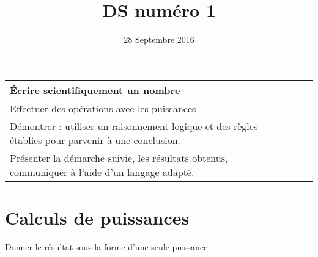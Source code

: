 \documentclass[a4paper,11pt]{exam}
\date{28 Septembre 2016}
\title{DS num\'ero 1}
\makeatletter
\def\maketitle{%
	\par\centering\Huge\textbf{\@title}%
	\par}
\makeatother
\begin{document}
	
	\maketitle

\begin{small}
\begin{center}
	\begin{tabular}{|@{\ }l@{}|@{\ }c@{\ }|}
		\hline
		\'Ecrire scientifiquement un nombre &  \ \ \ \\
		\hline
		Effectuer des opérations avec les puissances &  \\
		\hline
		Démontrer : utiliser un raisonnement logique et des règles établies pour parvenir à une conclusion. &  \\
		\hline
		Présenter la démarche suivie, les résultats obtenus, communiquer à l’aide d’un langage adapté. &  \\
		\hline
	\end{tabular}
\end{center}
\end{small}	
	

\section{Calculs de puissances}

Donner le résultat sous la forme d'une seule puissance.

	
\end{document}
